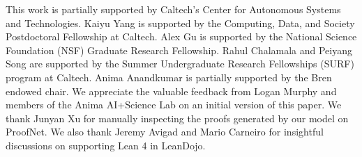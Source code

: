 \begin{ack}
\label{sec:ack}
This work is partially supported by Caltech's Center for Autonomous Systems and Technologies. Kaiyu Yang is supported by the Computing, Data, and Society Postdoctoral Fellowship at Caltech. Alex Gu is supported by the National Science Foundation (NSF) Graduate Research Fellowship. Rahul Chalamala and Peiyang Song are supported by the Summer Undergraduate Research Fellowships (SURF) program at Caltech. Anima Anandkumar is partially supported by the Bren endowed chair. We appreciate the valuable feedback from Logan Murphy and members of the Anima AI+Science Lab on an initial version of this paper. We thank Junyan Xu for manually inspecting the proofs generated by our model on ProofNet. We also thank Jeremy Avigad and Mario Carneiro for insightful discussions on supporting Lean 4 in LeanDojo.
\end{ack}